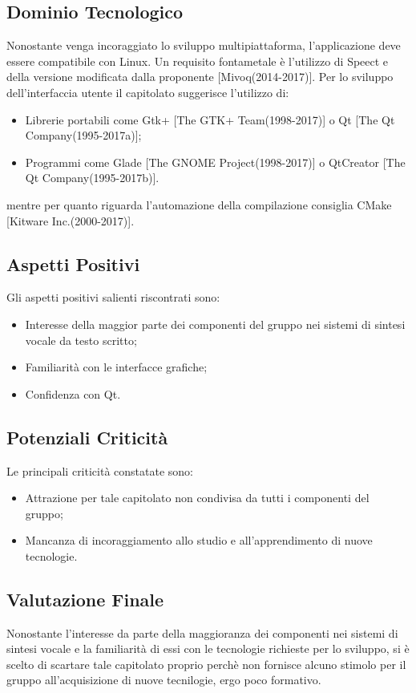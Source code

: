 \subsection{Dominio Tecnologico}
	Nonostante venga incoraggiato lo sviluppo multipiattaforma, l'applicazione deve essere compatibile con Linux. Un requisito fontametale è l'utilizzo di Speect e della versione modificata dalla proponente [Mivoq(2014-2017)].
	\newline \newline Per lo sviluppo dell'interfaccia utente il capitolato suggerisce l'utilizzo di:
	\begin{itemize}
		\item Librerie portabili come Gtk+ [The GTK+ Team(1998-2017)] o Qt [The Qt Company(1995-2017a)];
		\item Programmi come Glade [The GNOME Project(1998-2017)] o QtCreator [The Qt Company(1995-2017b)].
	\end{itemize}
	mentre per quanto riguarda l'automazione della compilazione consiglia CMake [Kitware Inc.(2000-2017)].
	
\subsection{Aspetti Positivi}
	Gli aspetti positivi salienti riscontrati sono:
	\begin{itemize}
		\item Interesse della maggior parte dei componenti del gruppo nei sistemi di sintesi vocale da testo scritto;
		\item Familiarità con le interfacce grafiche;
		\item Confidenza con Qt.
	\end{itemize}
	
\subsection{Potenziali Criticità}
	Le principali criticità constatate sono:
	\begin{itemize}
		\item Attrazione per tale capitolato non condivisa da tutti i componenti del gruppo;
		\item Mancanza di incoraggiamento allo studio e all'apprendimento di nuove tecnologie.
	\end{itemize}

\subsection{Valutazione Finale}
	Nonostante l'interesse da parte della maggioranza dei componenti nei sistemi di sintesi vocale e la familiarità di essi con le tecnologie richieste per lo sviluppo, si è scelto di scartare tale capitolato proprio perchè non fornisce alcuno stimolo per il gruppo all'acquisizione di nuove tecnilogie, ergo poco formativo.